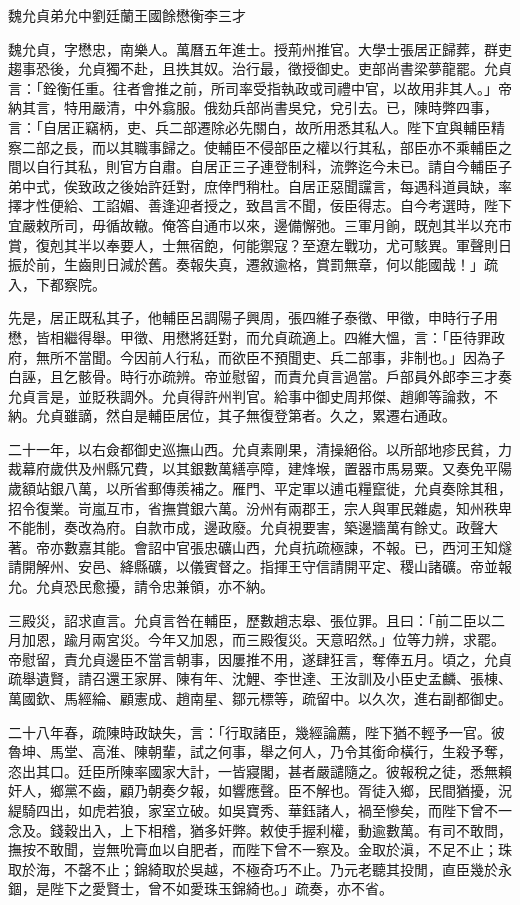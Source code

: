 
\begin{pinyinscope}
魏允貞弟允中劉廷蘭王國餘懋衡李三才

魏允貞，字懋忠，南樂人。萬曆五年進士。授荊州推官。大學士張居正歸葬，群吏趨事恐後，允貞獨不赴，且抶其奴。治行最，徵授御史。吏部尚書梁夢龍罷。允貞言：「銓衡任重。往者會推之前，所司率受指執政或司禮中官，以故用非其人。」帝納其言，特用嚴清，中外翕服。俄劾兵部尚書吳兌，兌引去。已，陳時弊四事，言：「自居正竊柄，吏、兵二部遷除必先關白，故所用悉其私人。陛下宜與輔臣精察二部之長，而以其職事歸之。使輔臣不侵部臣之權以行其私，部臣亦不乘輔臣之間以自行其私，則官方自肅。自居正三子連登制科，流弊迄今未已。請自今輔臣子弟中式，俟致政之後始許廷對，庶倖門稍杜。自居正惡聞讜言，每遇科道員缺，率擇才性便給、工諂媚、善逢迎者授之，致昌言不聞，佞臣得志。自今考選時，陛下宜嚴敕所司，毋循故轍。俺答自通市以來，邊備懈弛。三軍月餉，既剋其半以充市賞，復剋其半以奉要人，士無宿飽，何能禦寇？至遼左戰功，尤可駭異。軍聲則日振於前，生齒則日減於舊。奏報失真，遷敘逾格，賞罰無章，何以能國哉！」疏入，下都察院。

先是，居正既私其子，他輔臣呂調陽子興周，張四維子泰徵、甲徵，申時行子用懋，皆相繼得舉。甲徵、用懋將廷對，而允貞疏適上。四維大慍，言：「臣待罪政府，無所不當聞。今因前人行私，而欲臣不預聞吏、兵二部事，非制也。」因為子白誣，且乞骸骨。時行亦疏辨。帝並慰留，而責允貞言過當。戶部員外郎李三才奏允貞言是，並貶秩調外。允貞得許州判官。給事中御史周邦傑、趙卿等論救，不納。允貞雖謫，然自是輔臣居位，其子無復登第者。久之，累遷右通政。

二十一年，以右僉都御史巡撫山西。允貞素剛果，清操絕俗。以所部地疹民貧，力裁幕府歲供及州縣冗費，以其銀數萬繕亭障，建烽堠，置器市馬易粟。又奏免平陽歲額站銀八萬，以所省郵傳羨補之。雁門、平定軍以逋屯糧竄徙，允貞奏除其租，招令復業。岢嵐互市，省撫賞銀六萬。汾州有兩郡王，宗人與軍民雜處，知州秩卑不能制，奏改為府。自款市成，邊政廢。允貞視要害，築邊牆萬有餘丈。政聲大著。帝亦數嘉其能。會詔中官張忠礦山西，允貞抗疏極諫，不報。已，西河王知燧請開解州、安邑、絳縣礦，以儀賓督之。指揮王守信請開平定、稷山諸礦。帝並報允。允貞恐民愈擾，請令忠兼領，亦不納。

三殿災，詔求直言。允貞言咎在輔臣，歷數趙志皋、張位罪。且曰：「前二臣以二月加恩，踰月兩宮災。今年又加恩，而三殿復災。天意昭然。」位等力辨，求罷。帝慰留，責允貞邊臣不當言朝事，因屢推不用，遂肆狂言，奪俸五月。頃之，允貞疏舉遺賢，請召還王家屏、陳有年、沈鯉、李世達、王汝訓及小臣史孟麟、張棟、萬國欽、馬經綸、顧憲成、趙南星、鄒元標等，疏留中。以久次，進右副都御史。

二十八年春，疏陳時政缺失，言：「行取諸臣，幾經論薦，陛下猶不輕予一官。彼魯坤、馬堂、高淮、陳朝輩，試之何事，舉之何人，乃令其銜命橫行，生殺予奪，恣出其口。廷臣所陳率國家大計，一皆寢閣，甚者嚴譴隨之。彼報稅之徒，悉無賴奸人，鄉黨不齒，顧乃朝奏夕報，如響應聲。臣不解也。胥徒入鄉，民間猶擾，況緹騎四出，如虎若狼，家室立破。如吳寶秀、華鈺諸人，禍至慘矣，而陛下曾不一念及。錢穀出入，上下相稽，猶多奸弊。敕使手握利權，動逾數萬。有司不敢問，撫按不敢聞，豈無吮膏血以自肥者，而陛下曾不一察及。金取於滇，不足不止；珠取於海，不罄不止；錦綺取於吳越，不極奇巧不止。乃元老聽其投閒，直臣幾於永錮，是陛下之愛賢士，曾不如愛珠玉錦綺也。」疏奏，亦不省。


\end{pinyinscope}
